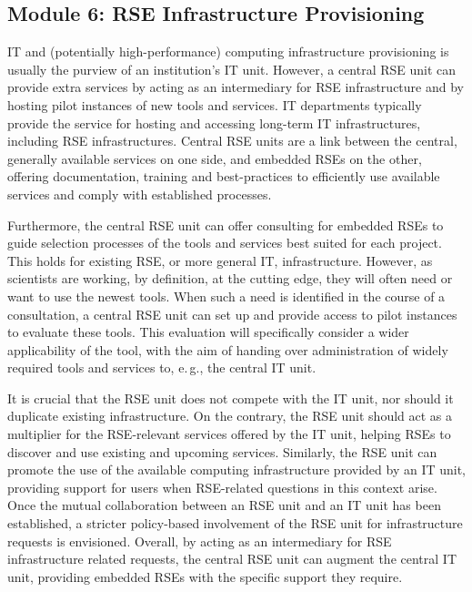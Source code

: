 \documentclass[a4paper]{article}
\makeatletter
\newcommand*{\eg}{e.\,g.\@\xspace}
\makeatother
\begin{document}
\subsection{Module 6: RSE Infrastructure Provisioning}%
\label{sec:infrastructure}

IT and (potentially high-performance) computing infrastructure provisioning is usually the purview of an institution's IT unit.
However, a central RSE unit can provide extra services by acting as an intermediary for RSE infrastructure and by hosting pilot instances of new tools and services.
IT departments typically provide the service for hosting and accessing long-term IT infrastructures, including RSE infrastructures.
Central RSE units are a link between the central, generally available services on one side,
and embedded RSEs on the other, offering documentation, training and best-practices to efficiently use available services and comply with established processes.

Furthermore, the central RSE unit can offer consulting for embedded RSEs to guide selection processes of the tools and services best suited for each project.
This holds for existing RSE, or more general IT, infrastructure.
However, as scientists are working, by definition, at the cutting edge, they will often need or want to use the newest tools.
When such a need is identified in the course of a consultation, a central RSE unit can set up and provide access to pilot instances to evaluate these tools.
This evaluation will specifically consider a wider applicability of the tool, with the aim of handing over administration of widely required tools and services to, \eg{}, the central IT unit.

It is crucial that the RSE unit does not compete with the IT unit, nor should it duplicate existing infrastructure.
On the contrary, the RSE unit should act as a multiplier for the RSE-relevant services offered by the IT unit, helping RSEs to discover and use existing and upcoming services.
Similarly, the RSE unit can promote the use of the available computing infrastructure provided by an IT unit, providing support for users when RSE-related questions in this context arise.
Once the mutual collaboration between an RSE unit and an IT unit has been established, a stricter policy-based involvement of the RSE unit for infrastructure requests is envisioned.
Overall, by acting as an intermediary for RSE infrastructure related requests, the central RSE unit can augment the central IT unit, providing embedded RSEs with the specific support they require.
\end{document}
